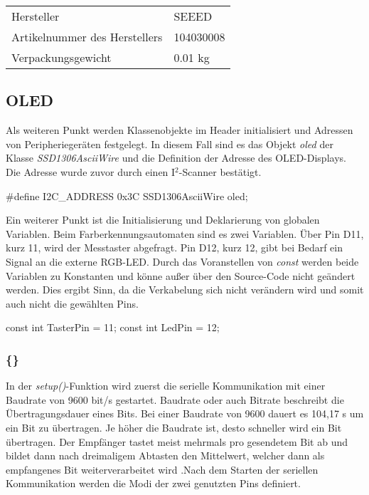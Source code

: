 \begin{tabular}{ll}
Hersteller &  SEEED \\
Artikelnummer des Herstellers &  104030008 \\
Verpackungsgewicht  & 0.01 kg \\
\end{tabular}



\subsection{OLED}


Als weiteren Punkt werden Klassenobjekte im Header initialisiert und Adressen von Peripheriegeräten festgelegt. In diesem Fall sind es das Objekt \textit{oled} der Klasse \textit{SSD1306AsciiWire} und die Definition der Adresse des OLED-Displays. Die Adresse wurde zuvor durch einen I$^2$-Scanner bestätigt.

\begin{Arduino}		
    #define I2C_ADDRESS 0x3C  
    SSD1306AsciiWire oled;  
\end{Arduino}

Ein weiterer Punkt ist die Initialisierung und Deklarierung von globalen Variablen. Beim Farberkennungsautomaten sind es zwei Variablen. Über Pin D11, kurz 11, wird der Messtaster abgefragt. Pin D12, kurz 12, gibt bei Bedarf ein Signal an die externe RGB-LED. Durch das Voranstellen von \textit{const} werden beide Variablen zu Konstanten und könne außer über den Source-Code nicht geändert werden. Dies ergibt Sinn, da die Verkabelung sich nicht verändern wird und somit auch nicht die gewählten Pins.

\begin{Arduino}		
    const int TasterPin = 11; 
    const int LedPin = 12;   
\end{Arduino}

\subsubsection{\{\}}

In der \textit{setup()}-Funktion wird zuerst die serielle Kommunikation mit einer Baudrate von 9600 bit/s gestartet. Baudrate oder auch Bitrate beschreibt die Übertragungsdauer eines Bits. Bei einer Baudrate von 9600 dauert es 104,17 \textmu s um ein Bit zu übertragen. Je höher die Baudrate ist, desto schneller wird ein Bit übertragen. Der Empfänger tastet meist mehrmals pro gesendetem Bit ab und bildet dann nach dreimaligem Abtasten den Mittelwert, welcher dann als empfangenes Bit weiterverarbeitet wird \cite{Gehrke:2022}.Nach dem Starten der seriellen Kommunikation werden die Modi der zwei genutzten Pins definiert. 

